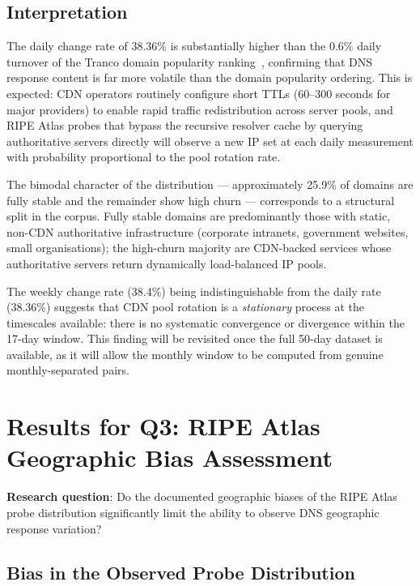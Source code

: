 \subsection{Interpretation}
\label{subsec:4.3.2}

The daily change rate of 38.36\% is substantially higher than the 0.6\% daily turnover of the Tranco domain popularity ranking~\cite{LePochat2019}, confirming that DNS response content is far more volatile than the domain popularity ordering. This is expected: CDN operators routinely configure short TTLs (60--300 seconds for major providers) to enable rapid traffic redistribution across server pools, and RIPE Atlas probes that bypass the recursive resolver cache by querying authoritative servers directly will observe a new IP set at each daily measurement with probability proportional to the pool rotation rate.

The bimodal character of the distribution --- approximately 25.9\% of domains are fully stable and the remainder show high churn --- corresponds to a structural split in the corpus. Fully stable domains are predominantly those with static, non-CDN authoritative infrastructure (corporate intranets, government websites, small organisations); the high-churn majority are CDN-backed services whose authoritative servers return dynamically load-balanced IP pools.

The weekly change rate (38.4\%) being indistinguishable from the daily rate (38.36\%) suggests that CDN pool rotation is a \emph{stationary} process at the timescales available: there is no systematic convergence or divergence within the 17-day window. This finding will be revisited once the full 50-day dataset is available, as it will allow the monthly window to be computed from genuine monthly-separated pairs.

\bigskip
\section{Results for Q3: RIPE Atlas Geographic Bias Assessment}
\label{sec:4.4}

\textbf{Research question}: Do the documented geographic biases of the RIPE Atlas probe distribution significantly limit the ability to observe DNS geographic response variation?

\subsection{Bias in the Observed Probe Distribution}
\label{subsec:4.4.1}

